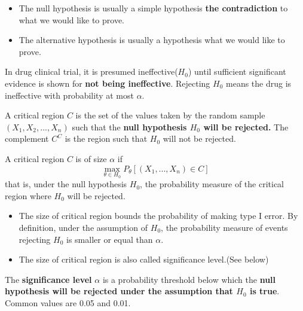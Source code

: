\begin{refsection}
\begin{remark}\hfill
	\begin{itemize}
		\item The null hypothesis is usually
		a simple hypothesis \textbf{the contradiction} to what we would like to prove.
		\item The alternative hypothesis is usually 
		a hypothesis what we would like to prove.
	\end{itemize}
\end{remark}

\begin{example}
	In drug clinical trial, it is presumed ineffective($H_0$) until sufficient significant evidence is shown for \textbf{not being ineffective}. Rejecting $H_0$ means the drug is ineffective with probability at most $\alpha$. 
\end{example}


\begin{definition}\cite[245]{hoggintroduction}
	A critical region $C$ is the set of the values taken by the random sample $(X_1,X_2,...,X_n)$ such that the \textbf{null hypothesis $H_0$ will be rejected.} The complement $C^C$ is the region such that $H_0$ will not be rejected.	
\end{definition}

\begin{definition}
A critical region $C$ is of size $\alpha$ if
$$\max_{\theta \in H_0} P_\theta[(X_1,...,X_n)\in C]$$
that is, under the null hypothesis $H_0$, the probability measure of the critical region where $H_0$ will be rejected.
\end{definition}

\begin{remark}\hfill
	\begin{itemize}
		\item The size of critical region bounds the probability of making type I error. By definition, under the assumption of $H_0$, the probability measure of events rejecting $H_0$ is smaller or equal than $\alpha$. 
		\item The size of critical region is also called significance level.(See below)
	\end{itemize}
\end{remark}


\begin{definition}
The \textbf{significance level} $\alpha$ is a probability threshold below which the \textbf{null hypothesis will be rejected under the assumption that $H_0$ is true}. 
Common values are 0.05 and 0.01.	
\end{definition}


\end{refsection}
